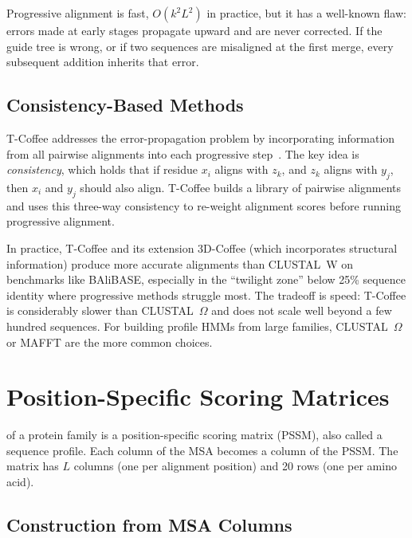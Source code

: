 Progressive alignment is fast, $O(k^2 L^2)$ in practice, but it has a well-known flaw: errors made at early stages propagate upward and are never corrected.
If the guide tree is wrong, or if two sequences are misaligned at the first merge, every subsequent addition inherits that error.

\subsection{Consistency-Based Methods}
\label{sec:consistency}

T-Coffee addresses the error-propagation problem by incorporating information from all pairwise alignments into each progressive step~\cite{notredame2000}.
The key idea is \textit{consistency}, which holds that if residue $x_i$ aligns with $z_k$, and $z_k$ aligns with $y_j$, then $x_i$ and $y_j$ should also align.
T-Coffee builds a library of pairwise alignments and uses this three-way consistency to re-weight alignment scores before running progressive alignment.

In practice, T-Coffee and its extension 3D-Coffee (which incorporates structural information) produce more accurate alignments than CLUSTAL~W on benchmarks like BAliBASE, especially in the ``twilight zone'' below 25\% sequence identity where progressive methods struggle most.
The tradeoff is speed: T-Coffee is considerably slower than CLUSTAL~$\Omega$ and does not scale well beyond a few hundred sequences.
For building profile HMMs from large families, CLUSTAL~$\Omega$ or MAFFT are the more common choices.


\section{Position-Specific Scoring Matrices}
\label{sec:pssm}

 of a protein family is a position-specific scoring matrix (PSSM), also called a sequence profile.
Each column of the MSA becomes a column of the PSSM.
The matrix has $L$ columns (one per alignment position) and 20 rows (one per amino acid).

\subsection{Construction from MSA Columns}
\label{sec:pssm-construction}

